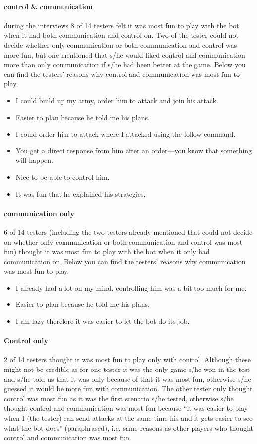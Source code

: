 \paragraph{control \& communication}
during the interviews 8 of 14 testers felt it was most fun to play with the bot when it had both
communication and control on. Two of the tester could not decide whether only communication or both
communication and control was more fun, but one mentioned that s/he would liked control and
communication more than only communication if s/he had been better at the game. Below you can find
the testers' reasons why control and communication was most fun to play.
\begin{itemize}
	\item I could build up my army, order him to attack and join his attack.
	\item Easier to plan because he told me his plans.
	\item I could order him to attack where I attacked using the follow command.
	\item You get a direct response from him after an order—you know that something will happen.
	\item Nice to be able to control him.
	\item It was fun that he explained his strategies.
\end{itemize}

\paragraph{communication only}
6 of 14 testers (including the two testers already mentioned that could not decide on whether only
communication or both communication and control was most fun) thought it was most fun to play with
the bot when it only had communication on. Below you can find the testers' reasons why communication
was most fun to play.
\begin{itemize}
	\item I already had a lot on my mind, controlling him was a bit too much for me.	
	\item Easier to plan because he told me his plans.
	\item I am lazy therefore it was easier to let the bot do its job.
\end{itemize}

\paragraph{Control only}
2 of 14 testers thought it was most fun to play only with control. Although these might not be
credible as for one tester it was the only game s/he won in the test and s/he told us that it was
only because of that it was most fun, otherwise s/he guessed it would be more fun with
communication. The other tester only thought control was most fun as it was the first scenario s/he
tested, otherwise s/he thought control and communication was most fun because ``it was easier to play
when I (the tester) can send attacks at the same time his and it gets easier to see what the bot
does'' (paraphrased), i.e. same reasons as other players who thought control and communication was most fun.


